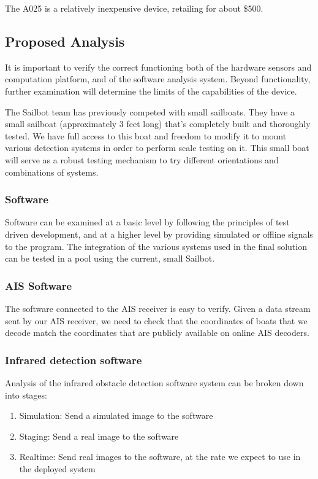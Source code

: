 The A025 is a relatively inexpensive device, retailing for about \$500. 


\subsection{\label{sec:method:proposed-analysis}Proposed Analysis}
It is important to verify the correct functioning both of the hardware sensors and computation platform, and of the software analysis system. Beyond functionality, further examination will determine the limits of the capabilities of the device.

The Sailbot team has previously competed with small sailboats. They have a small sailboat (approximately 3 feet long) that's completely built and thoroughly tested. We have full access to this boat and freedom to modify it to mount various detection systems in order to perform scale testing on it. This small boat will serve as a robust testing mechanism to try different orientations and combinations of systems.

\subsubsection{\label{sec:method:proposed-analysis:software}Software}
Software can be examined at a basic level by following the principles of test driven development, and at a higher level by providing simulated or offline signals to the program. The integration of the various systems used in the final solution can be tested in a pool using the current, small Sailbot.

\subsubsection{\label{sec:method:proposed-analysis:ais-software}AIS Software}

The software connected to the AIS receiver is easy to verify. Given a data stream sent by our AIS receiver, we need to check that the coordinates of boats that we decode match the coordinates that are publicly available on online AIS decoders.

\subsubsection{\label{sec:method:proposed-analysis:infrared-software}Infrared detection software}

Analysis of the infrared obstacle detection software system can be broken down into stages:
\begin{enumerate}
\item Simulation: Send a simulated image to the software
\item Staging: Send a real image to the software
\item Realtime: Send real images to the software, at the rate we expect to use in the deployed system
\end{enumerate}

